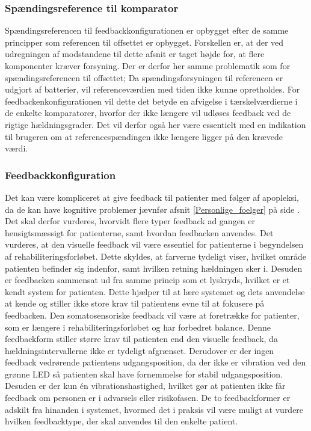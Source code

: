 \subsubsection{Spændingsreference til komparator}
Spændingsreferencen til feedbackkonfigurationen er opbygget efter de samme principper som referencen til offsettet er opbygget. Forskellen er, at der ved udregningen af modstandene til dette afsnit er taget højde for, at flere komponenter kræver forsyning. Der er derfor her samme problematik som for spændingsreferencen til offsettet; Da spændingsforsyningen til referencen er udgjort af batterier, vil referenceværdien med tiden ikke kunne opretholdes. For feedbackenkonfigurationen vil dette det betyde en afvigelse i tærskelværdierne i de enkelte komparatorer, hvorfor der ikke længere vil udløses feedback ved de rigtige hældningsgrader. Det vil derfor også her være essentielt med en indikation til brugeren om at referencespændingen ikke længere ligger på den krævede værdi. 

\subsubsection{Feedbackkonfiguration}
Det kan være kompliceret at give feedback til patienter med følger af apopleksi, da de kan have kognitive problemer jævnfør afsnit \ref{Personlige_foelger} på side \pageref{Personlige_foelger}. Det skal derfor vurderes, hvorvidt flere typer feedback ad gangen er hensigtsmæssigt for patienterne, samt hvordan feedbacken anvendes. Det vurderes, at den visuelle feedback vil være essentiel for patienterne i begyndelsen af rehabiliteringsforløbet. Dette skyldes, at farverne tydeligt viser, hvilket område patienten befinder sig indenfor, samt hvilken retning hældningen sker i. Desuden er feedbacken sammensat ud fra samme princip som et lyskryds, hvilket er et kendt system for patienten. Dette hjælper til at lære systemet og dets anvendelse at kende og stiller ikke store krav til patientens evne til at fokusere på feedbacken. Den somatosensoriske feedback vil være at foretrække for patienter, som er længere i rehabiliteringsforløbet og har forbedret balance. Denne feedbackform stiller større krav til patienten end den visuelle feedback, da hældningsintervallerne ikke er tydeligt afgrænset. Derudover er der ingen feedback vedrørende patientens udgangsposition, da der ikke er vibration ved den grønne LED så patienten skal have fornemmelse for stabil udgangsposition. Desuden er der kun én vibrationshastighed, hvilket gør at patienten ikke får feedback om personen er i advarsels eller risikofasen. De to feedbackformer er adskilt fra hinanden i systemet, hvormed det i praksis vil være muligt at vurdere hvilken feedbacktype, der skal anvendes til den enkelte patient.\\


